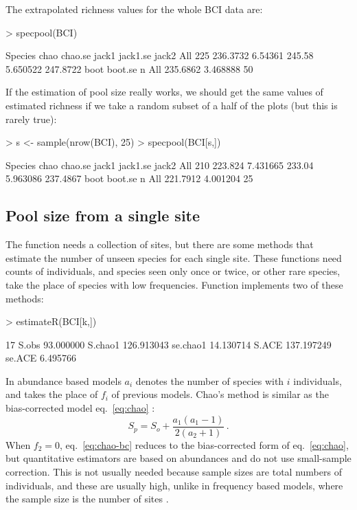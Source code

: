 \documentclass[a4paper,10pt,twocolumn]{article}
\begin{document}
The extrapolated richness values for the whole BCI data are:
\begin{Schunk}
\begin{Sinput}
> specpool(BCI)
\end{Sinput}
\begin{Soutput}
    Species     chao chao.se  jack1 jack1.se    jack2
All     225 236.3732 6.54361 245.58 5.650522 247.8722
        boot  boot.se  n
All 235.6862 3.468888 50
\end{Soutput}
\end{Schunk}
If the estimation of pool size really works, we should get the same
values of estimated richness if we take a random subset of a half of
the plots (but this is rarely true):
\begin{Schunk}
\begin{Sinput}
> s <- sample(nrow(BCI), 25)
> specpool(BCI[s,])
\end{Sinput}
\begin{Soutput}
    Species    chao  chao.se  jack1 jack1.se    jack2
All     210 223.824 7.431665 233.04 5.963086 237.4867
        boot  boot.se  n
All 221.7912 4.001204 25
\end{Soutput}
\end{Schunk}

\subsection{Pool size from a single site}

The  function needs a collection of sites, but there
are some methods that estimate the number of unseen species for each
single site.  These functions need counts of individuals, and species
seen only once or twice, or other rare species, take the place of
species with low frequencies.  Function  implements
two of these methods:
\begin{Schunk}
\begin{Sinput}
> estimateR(BCI[k,])
\end{Sinput}
\begin{Soutput}
                 17
S.obs     93.000000
S.chao1  126.913043
se.chao1  14.130714
S.ACE    137.197249
se.ACE     6.495766
\end{Soutput}
\end{Schunk}
In abundance based models $a_i$ denotes the number of species with $i$
individuals, and takes the place of $f_i$ of previous models.
Chao's method is similar as the bias-corrected model
eq.~\ref{eq:chao} \citep{Chao87, ChiuEtal14}:
\begin{equation}
  \label{eq:chao-bc}
  S_p = S_o + \frac{a_1 (a_1 - 1)}{2 (a_2 + 1)}\,.
\end{equation}
When $f_2=0$, eq.~\ref{eq:chao-bc} reduces to the bias-corrected form
of eq.~\ref{eq:chao}, but quantitative estimators are based on
abundances and do not use small-sample correction. This is not usually
needed because sample sizes are total numbers of individuals, and
these are usually high, unlike in frequency based models, where the
sample size is the number of sites \citep{ChiuEtal14}. 
\end{document}
